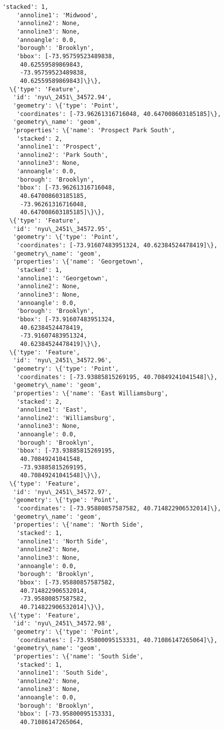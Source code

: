 \documentclass[11pt]{article}
\begin{document}
\begin{tcolorbox}[breakable, size=fbox, boxrule=.5pt, pad at break*=1mm, opacityfill=0]
\begin{Verbatim}[commandchars=\\\{\}]
    'stacked': 1,
    'annoline1': 'Midwood',
    'annoline2': None,
    'annoline3': None,
    'annoangle': 0.0,
    'borough': 'Brooklyn',
    'bbox': [-73.95759523489838,
     40.62559589869843,
     -73.95759523489838,
     40.62559589869843]\}\},
  \{'type': 'Feature',
   'id': 'nyu\_2451\_34572.94',
   'geometry': \{'type': 'Point',
    'coordinates': [-73.96261316716048, 40.647008603185185]\},
   'geometry\_name': 'geom',
   'properties': \{'name': 'Prospect Park South',
    'stacked': 2,
    'annoline1': 'Prospect',
    'annoline2': 'Park South',
    'annoline3': None,
    'annoangle': 0.0,
    'borough': 'Brooklyn',
    'bbox': [-73.96261316716048,
     40.647008603185185,
     -73.96261316716048,
     40.647008603185185]\}\},
  \{'type': 'Feature',
   'id': 'nyu\_2451\_34572.95',
   'geometry': \{'type': 'Point',
    'coordinates': [-73.91607483951324, 40.62384524478419]\},
   'geometry\_name': 'geom',
   'properties': \{'name': 'Georgetown',
    'stacked': 1,
    'annoline1': 'Georgetown',
    'annoline2': None,
    'annoline3': None,
    'annoangle': 0.0,
    'borough': 'Brooklyn',
    'bbox': [-73.91607483951324,
     40.62384524478419,
     -73.91607483951324,
     40.62384524478419]\}\},
  \{'type': 'Feature',
   'id': 'nyu\_2451\_34572.96',
   'geometry': \{'type': 'Point',
    'coordinates': [-73.93885815269195, 40.70849241041548]\},
   'geometry\_name': 'geom',
   'properties': \{'name': 'East Williamsburg',
    'stacked': 2,
    'annoline1': 'East',
    'annoline2': 'Williamsburg',
    'annoline3': None,
    'annoangle': 0.0,
    'borough': 'Brooklyn',
    'bbox': [-73.93885815269195,
     40.70849241041548,
     -73.93885815269195,
     40.70849241041548]\}\},
  \{'type': 'Feature',
   'id': 'nyu\_2451\_34572.97',
   'geometry': \{'type': 'Point',
    'coordinates': [-73.95880857587582, 40.714822906532014]\},
   'geometry\_name': 'geom',
   'properties': \{'name': 'North Side',
    'stacked': 1,
    'annoline1': 'North Side',
    'annoline2': None,
    'annoline3': None,
    'annoangle': 0.0,
    'borough': 'Brooklyn',
    'bbox': [-73.95880857587582,
     40.714822906532014,
     -73.95880857587582,
     40.714822906532014]\}\},
  \{'type': 'Feature',
   'id': 'nyu\_2451\_34572.98',
   'geometry': \{'type': 'Point',
    'coordinates': [-73.95800095153331, 40.71086147265064]\},
   'geometry\_name': 'geom',
   'properties': \{'name': 'South Side',
    'stacked': 1,
    'annoline1': 'South Side',
    'annoline2': None,
    'annoline3': None,
    'annoangle': 0.0,
    'borough': 'Brooklyn',
    'bbox': [-73.95800095153331,
     40.71086147265064,

\end{Verbatim}
\end{tcolorbox}
\end{document}
